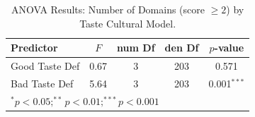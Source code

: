 \begin{table}[htpb]
\centering
\begin{tabular}{lcccc}
\toprule
Predictor & $F$ & num Df & den Df & $p$-value \\
\midrule
Good Taste Def & 0.67 & 3 & 203 & 0.571 \\
Bad Taste Def & 5.64 & 3 & 203 & 0.001$^{***}$ \\
\bottomrule
\multicolumn{5}{l}{\footnotesize $^{*}p<0.05; ^{**}p<0.01; ^{***}p<0.001$} \\
\end{tabular}
\caption{ANOVA Results: Number of Domains (score $\geq 2$) by Taste Cultural Model.}
\label{tab:anova_domain_counts}
\end{table}

